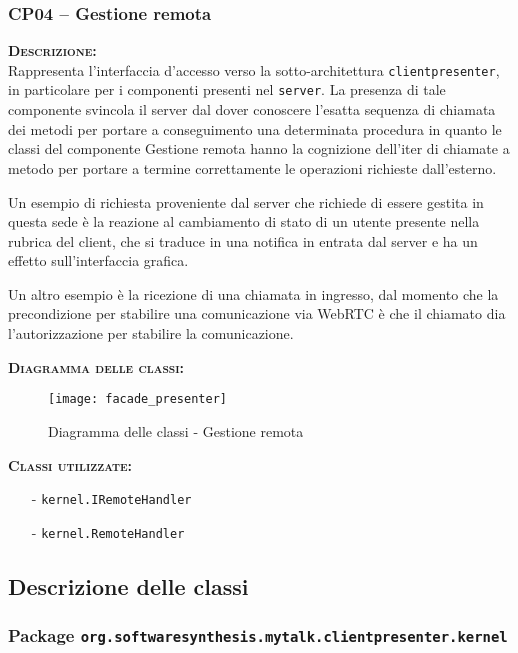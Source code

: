 \subsubsection{CP04 -- Gestione remota}
\begin{description}
	\item{\scshape\bfseries Descrizione:}\\
Rappresenta l'interfaccia d'accesso verso la sotto-architettura \texttt{clientpresenter}, in particolare per i componenti presenti nel \texttt{server}. La presenza di tale componente svincola il server dal dover conoscere l'esatta sequenza di chiamata dei metodi per portare a conseguimento una determinata procedura in quanto le classi del componente \textsf{Gestione remota} hanno la cognizione dell'iter di chiamate a metodo per portare a termine correttamente le operazioni richieste dall'esterno.

Un esempio di richiesta proveniente dal server che richiede di essere gestita in questa sede è la reazione al cambiamento di stato di un utente presente nella rubrica del client, che si traduce in una notifica in entrata dal server e ha un effetto sull'interfaccia grafica.

Un altro esempio è la ricezione di una chiamata in ingresso, dal momento che la precondizione per stabilire una comunicazione via WebRTC è che il chiamato dia l'autorizzazione per stabilire la comunicazione.

	\item{\scshape\bfseries Diagramma delle classi:}
\begin{figure}[H]
\centering
  \texttt{[image: facade\_presenter]}
  \caption{Diagramma delle classi - Gestione remota}\label{fig:facade_presenter}
\end{figure}

	\item{\scshape\bfseries Classi utilizzate:} 
	\begin{itemize}[noitemsep,nolistsep]
		\item[-] \texttt{kernel.IRemoteHandler}
		\item[-] \texttt{kernel.RemoteHandler}
	\end{itemize}
\end{description}

\subsection{Descrizione delle classi}

\subsubsection{Package \texttt{org.softwaresynthesis.mytalk.clientpresenter.kernel}}

